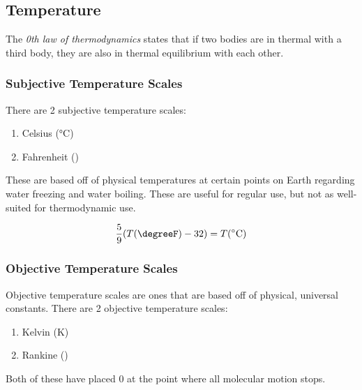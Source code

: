\subsection{Temperature}\label{subsec:Temperature}
\begin{definition}\label{def:0_Law_Thermo}
  The \emph{0th law of thermodynamics} states that if two bodies are in thermal  with a third body, they are also in thermal equilibrium with each other.
\end{definition}

\subsubsection{Subjective Temperature Scales}\label{subsubsec:Subjective_Temp_Scales}
There are 2 subjective temperature scales:
\begin{enumerate}[noitemsep]
\item Celsius (\si{\degreeCelsius})
\item Fahrenheit (\si{\degreeF})
\end{enumerate}

These are based off of physical temperatures at certain points on Earth regarding water freezing and water boiling.
These are useful for regular use, but not as well-suited for thermodynamic use.

\begin{equation}\label{eq:Fahrenheit_Celsius}
  \frac{5}{9} (\Temp(\si{\degreeF}) - 32) = \Temp(\si{\degreeCelsius})
\end{equation}

\subsubsection{Objective Temperature Scales}\label{subsubsec:Objective_Temp_Scales}
Objective temperature scales are ones that are based off of physical, universal constants.
There are 2 objective temperature scales:
\begin{enumerate}[noitemsep]
\item Kelvin (\si{\kelvin})
\item Rankine (\si{\rankine})
\end{enumerate}

Both of these have placed $0$ at the point where all molecular motion stops.


